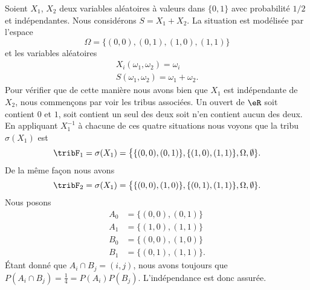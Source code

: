 \begin{example}
    Soient \( X_1\), \( X_2\) deux variables aléatoires à valeurs dans \( \{ 0,1 \}\) avec probabilité \( 1/2\) et indépendantes. Nous considérons \( S=X_1+X_2\). La situation est modélisée par l'espace
    \begin{equation}
        \Omega=\{ (0,0),(0,1),(1,0),(1,1) \}
    \end{equation}
    et les variables aléatoires
    \begin{subequations}
        \begin{align}
            X_i(\omega_1,\omega_2)=\omega_{i}\\
            S(\omega_1,\omega_2)=\omega_1+\omega_2.
        \end{align}
    \end{subequations}
    Pour vérifier que de cette manière nous avons bien que \( X_1\) est indépendante de \( X_2\), nous commençons par voir les tribus associées. Un ouvert de \( \eR\) soit contient \( 0\) et \( 1\), soit contient un seul des deux soit n'en contient aucun des deux. En appliquant \( X_1^{-1}\) à chacune de ces quatre situations nous voyons que la tribu \( \sigma(X_1)\) est
    \begin{equation}
        \tribF_1=\sigma(X_1)=\big\{ \{ (0,0),(0,1) \},\{ (1,0),(1,1) \},\Omega,\emptyset \}.
    \end{equation}
    De la même façon nous avons
    \begin{equation}
        \tribF_2=\sigma(X_1)=\big\{ \{ (0,0),(1,0) \},\{ (0,1),(1,1) \},\Omega,\emptyset \}.
    \end{equation}
    Nous posons
    \begin{subequations}
        \begin{align}
            A_0&=\{ (0,0),(0,1) \}\\
            A_1&=\{ (1,0),(1,1) \}\\
            B_0&=\{ (0,0),(1,0) \}\\
            B_1&=\{ (0,1),(1,1) \}.
        \end{align}
    \end{subequations}
    Étant donné que \( A_i\cap B_j=(i,j)\), nous avons toujours que \( P(A_i\cap B_j)=\frac{1}{ 4 }=P(A_i)P(B_j)\). L'indépendance est donc assurée.


\end{example}
